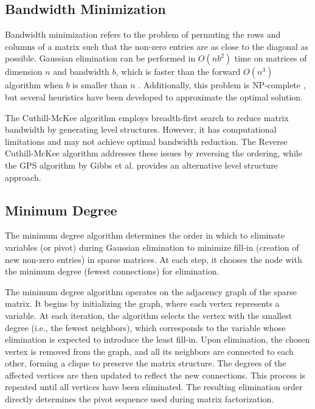 \subsection{Bandwidth Minimization}

Bandwidth minimization refers to the problem of permuting the rows and columns of a matrix such that the non-zero entries are as close to the diagonal as possible.  Gaussian elimination can be performed in $O(nb^2)$ time on matrices of dimension $n$ and bandwidth $b$, which is faster than the forward $O(n^3)$ algorithm when $b$ is smaller than $n$ \cite{lim_heuristics_2006}.  Additionally, this problem is NP-complete \cite{papadimitriou_np-completeness_1976}, but several heuristics have been developed to approximate the optimal solution.

The Cuthill-McKee algorithm \cite{cuthill_reducing_1969} employs breadth-first search to reduce matrix bandwidth by generating level structures. However, it has computational limitations and may not achieve optimal bandwidth reduction. The Reverse Cuthill-McKee algorithm \cite{george_computer_1981} addresses these issues by reversing the ordering, while the GPS algorithm by Gibbs et al. provides an alternative level structure approach.


\subsection{Minimum Degree}

The minimum degree algorithm \cite{tinney_direct_1967} determines the order in which to eliminate variables (or pivot) during Gaussian elimination to minimize fill-in (creation of new non-zero entries) in sparse matrices. At each step, it chooses the node with the minimum degree (fewest connections) for elimination.

The minimum degree algorithm operates on the adjacency graph of the sparse matrix. It begins by initializing the graph, where each vertex represents a variable. At each iteration, the algorithm selects the vertex with the smallest degree (i.e., the fewest neighbors), which corresponds to the variable whose elimination is expected to introduce the least fill-in. Upon elimination, the chosen vertex is removed from the graph, and all its neighbors are connected to each other, forming a clique to preserve the matrix structure. The degrees of the affected vertices are then updated to reflect the new connections. This process is repeated until all vertices have been eliminated. The resulting elimination order directly determines the pivot sequence used during matrix factorization.

